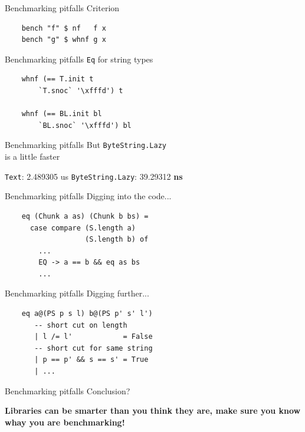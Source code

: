 \documentclass[20pt]{beamer}
\newcommand{\vspaced}{
    \vspace{5mm}
}
\begin{document}
\begin{frame}[fragile]{Benchmarking pitfalls}
    Criterion \\
    \vspaced
    \begin{lstlisting}
    bench "f" $ nf   f x
    bench "g" $ whnf g x
    \end{lstlisting}
\end{frame}

\begin{frame}[fragile]{Benchmarking pitfalls}
    \texttt{Eq} for string types \\
    \vspaced
    \begin{lstlisting}
    whnf (== T.init t
        `T.snoc` '\xfffd') t

    whnf (== BL.init bl
        `BL.snoc` '\xfffd') bl
    \end{lstlisting}
\end{frame}

\begin{frame}{Benchmarking pitfalls}
    But \texttt{ByteString.Lazy} \\
    is a little faster \\
    \vspaced
    \texttt{Text}: 2.489305 us
    \texttt{ByteString.Lazy}: 39.29312 \textbf{ns}
\end{frame}

\begin{frame}[fragile]{Benchmarking pitfalls}
    Digging into the code... \\
    \vspaced
    \begin{lstlisting}
    eq (Chunk a as) (Chunk b bs) =
      case compare (S.length a)
                   (S.length b) of
        ...
        EQ -> a == b && eq as bs
        ...
    \end{lstlisting}
\end{frame}

\begin{frame}[fragile]{Benchmarking pitfalls}
    Digging further... \\
    \vspaced
    \begin{lstlisting}
    eq a@(PS p s l) b@(PS p' s' l')
       -- short cut on length
       | l /= l'            = False
       -- short cut for same string
       | p == p' && s == s' = True
       | ...
    \end{lstlisting}
\end{frame}

\begin{frame}{Benchmarking pitfalls}
    Conclusion? \\
    \vspaced
    \textbf{Libraries can be smarter than you think they are, make sure you know
    whay you are benchmarking!}
\end{frame}
\end{document}
